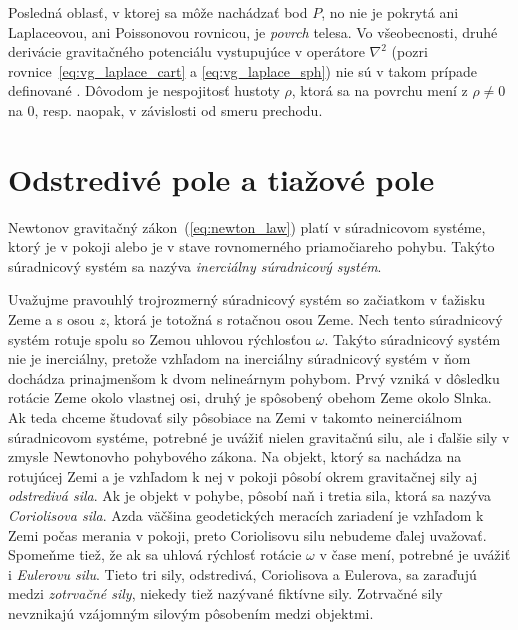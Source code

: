 \documentclass[a4paper, 12pt]{book}
\begin{document}
Posledná oblasť, v ktorej sa môže nachádzať bod $P$, no nie je pokrytá ani 
Laplaceovou, ani Poissonovou rovnicou, je \emph{povrch} telesa.  Vo 
všeobecnosti, druhé derivácie gravitačného potenciálu vystupujúce v operátore 
$\nabla^2$ (pozri rovnice~\ref{eq:vg_laplace_cart} a \ref{eq:vg_laplace_sph}) 
nie sú v takom prípade definované \citep{Kellogg1967}.  Dôvodom je nespojitosť 
hustoty $\rho$, ktorá sa na povrchu mení z $\rho \neq 0$ na 0, resp. naopak, 
v závislosti od smeru prechodu.






\section{Odstredivé pole a tiažové pole}
\label{sec:centrifugal_gravity_field}

Newtonov gravitačný zákon~(\ref{eq:newton_law}) platí v súradnicovom systéme, 
ktorý je v pokoji alebo je v stave rovnomerného priamočiareho pohybu.  Takýto 
súradnicový systém sa nazýva \emph{inerciálny súradnicový systém}.

Uvažujme pravouhlý trojrozmerný súradnicový systém so začiatkom v ťažisku Zeme 
a s osou $z$, ktorá je totožná s rotačnou osou Zeme.  Nech tento súradnicový 
systém rotuje spolu so Zemou uhlovou rýchlosťou $\omega$.  Takýto súradnicový 
systém nie je inerciálny, pretože vzhľadom na inerciálny súradnicový systém 
v ňom dochádza prinajmenšom k dvom nelineárnym pohybom.  Prvý vzniká v dôsledku 
rotácie Zeme okolo vlastnej osi, druhý je spôsobený obehom Zeme okolo Slnka.  
Ak teda chceme študovať sily pôsobiace na Zemi v takomto neinerciálnom 
súradnicovom systéme, potrebné je uvážiť nielen gravitačnú silu, ale i ďalšie 
sily v zmysle Newtonovho pohybového zákona.  Na objekt, ktorý sa nachádza na 
rotujúcej Zemi a je vzhľadom k nej v pokoji pôsobí okrem gravitačnej sily aj 
\emph{odstredivá sila}.  Ak je objekt v pohybe, pôsobí naň i tretia sila, ktorá 
sa nazýva \emph{Coriolisova sila}.  Azda väčšina geodetických meracích 
zariadení je vzhľadom k Zemi počas merania v pokoji, preto Coriolisovu silu 
nebudeme ďalej uvažovať.  Spomeňme tiež, že ak sa uhlová rýchlosť rotácie 
$\omega$ v čase mení, potrebné je uvážiť i \emph{Eulerovu silu}.  Tieto tri 
sily, odstredivá, Coriolisova a Eulerova, sa zaraďujú medzi \emph{zotrvačné 
sily}, niekedy tiež nazývané fiktívne sily.  Zotrvačné sily nevznikajú 
vzájomným silovým pôsobením medzi objektmi.
\end{document}
